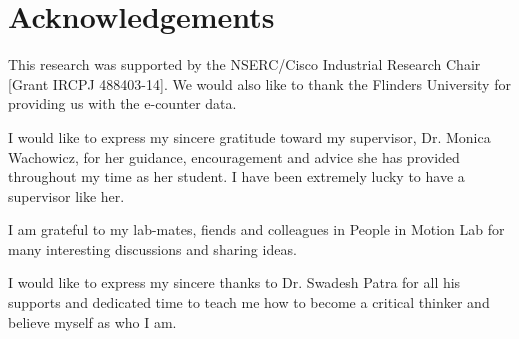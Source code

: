 \chapter*{Acknowledgements}

This research was supported by the NSERC/Cisco Industrial Research Chair [Grant IRCPJ 488403-14]. We would also like to thank the Flinders University for providing us with the e-counter data.

I would like to express my sincere gratitude toward my supervisor, Dr. Monica Wachowicz, for her guidance, encouragement and advice she has provided throughout my time as her student. I have been extremely lucky to have a supervisor like her.


I am  grateful to my lab-mates, fiends and colleagues in People in Motion Lab for many interesting discussions and sharing ideas. 

I would like to express my sincere thanks to Dr. Swadesh Patra for all his supports and dedicated time to teach me how to become a critical thinker and believe myself as who I am.  